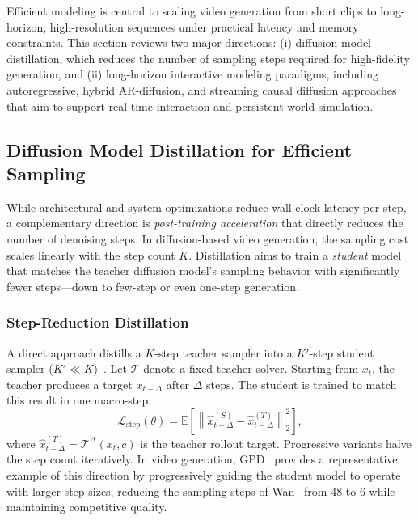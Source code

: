 \documentclass[lettersize,journal]{IEEEtran}
\begin{document}
Efficient modeling is central to scaling video generation from short clips to long-horizon, high-resolution sequences under practical latency and memory constraints. This section reviews two major directions: (i) diffusion model distillation, which reduces the number of sampling steps required for high-fidelity generation, and (ii) long-horizon interactive modeling paradigms, including autoregressive, hybrid AR-diffusion, and streaming causal diffusion approaches that aim to support real-time interaction and persistent world simulation.

\subsection{Diffusion Model Distillation for Efficient Sampling}
\label{subsec:diffusion_distillation}
While architectural and system optimizations reduce wall-clock latency per step, a complementary direction is \emph{post-training acceleration} that directly reduces the number of denoising steps. In diffusion-based video generation, the sampling cost scales linearly with the step count $K$. Distillation aims to train a \emph{student} model that matches the teacher diffusion model's sampling behavior with significantly fewer steps---down to few-step or even one-step generation.
\subsubsection{Step-Reduction Distillation}
A direct approach distills a $K$-step teacher sampler into a $K'$-step student sampler ($K'\ll K$)~\cite{salimans2022progressive,frans2024one}. 
Let $\mathcal{T}$ denote a fixed teacher solver. Starting from $x_t$, the teacher produces a target $x_{t-\Delta}$ after $\Delta$ steps. The student is trained to match this result in one macro-step:
\begin{equation}
\mathcal{L}_{\text{step}}(\theta)=
\mathbb{E}\left[\left\| \hat{x}^{(S)}_{t-\Delta}-\hat{x}^{(T)}_{t-\Delta}\right\|_2^2\right],
\label{eq:step_distill}
\end{equation}
where $\hat{x}^{(T)}_{t-\Delta}=\mathcal{T}^\Delta(x_t,c)$ is the teacher rollout target. Progressive variants halve the step count iteratively. In video generation, GPD~\cite{liang2026gpd} provides a representative example of this direction by progressively guiding the student model to operate with larger step sizes, reducing the sampling steps of Wan~\cite{wan2025wan} from 48 to 6 while maintaining competitive quality.
\end{document}
